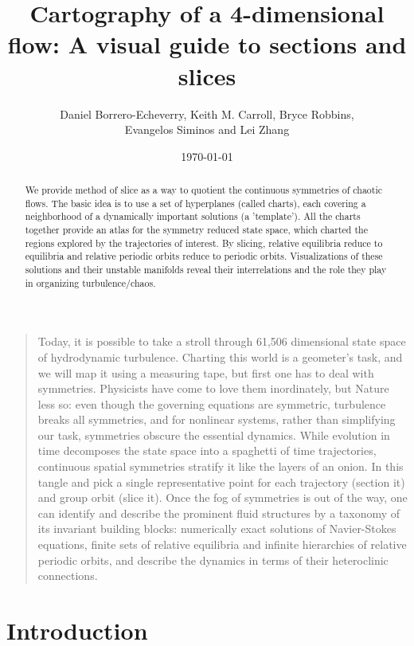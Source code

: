 \documentclass{article}
\title{Cartography of a 4-dimensional flow: A visual guide to sections and slices}
\author{Daniel Borrero-Echeverry, Keith M. Carroll, Bryce Robbins,\\
Evangelos Siminos and Lei Zhang}
\date{\today}
\begin{document}
\maketitle





    \begin{abstract}

We provide method of slice as a way to quotient the continuous symmetries
of chaotic flows. The basic idea is to use a set of hyperplanes (called
charts), each covering a neighborhood of a dynamically important
solutions (a 'template'). All the charts together provide an atlas for
the symmetry reduced state space, which charted the regions explored by
the trajectories of interest. By slicing, relative equilibria reduce to
equilibria and relative periodic orbits reduce to periodic orbits.
Visualizations of these solutions and their unstable manifolds reveal
their interrelations and the role they play in organizing
turbulence/chaos.

    \end{abstract}



    \begin{quotation}
Today, it is possible to take a stroll through 61,506 dimensional state space of hydrodynamic turbulence. Charting this world is a geometer's task, and we will map it using a measuring tape, but first one has to deal with symmetries. Physicists have come to love them inordinately, but Nature less so: even though the governing equations are symmetric, turbulence breaks all symmetries, and for nonlinear systems, rather than simplifying our task, symmetries obscure the essential dynamics. While evolution in time decomposes the state space into a spaghetti of time trajectories, continuous spatial symmetries stratify it like the layers of an onion. In this tangle and pick a single representative point for each trajectory (section it) and group orbit (slice it). Once the fog of symmetries is out of the way, one can identify and describe the prominent fluid structures by a taxonomy of its invariant building blocks: numerically exact solutions of Navier-Stokes equations, finite sets of relative equilibria and infinite hierarchies of relative periodic orbits, and describe the dynamics in terms of their heteroclinic connections.
    \end{quotation}

\section{Introduction}
\label{s:intro}
\end{document}
